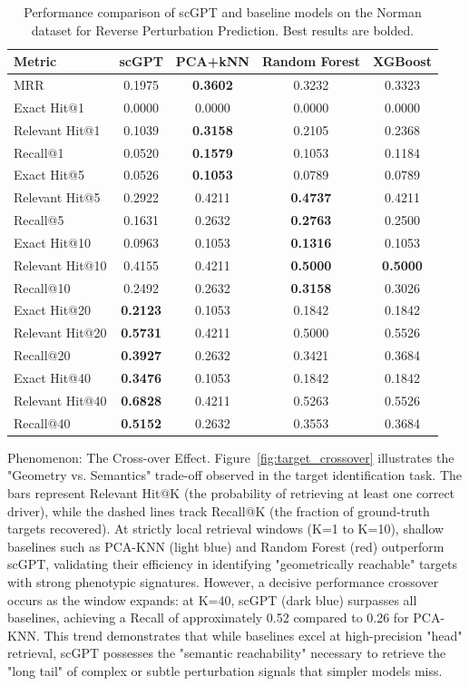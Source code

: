 \documentclass[conference]{IEEEtran}
\begin{document}
\begin{table}[h]
\caption{Performance comparison of scGPT and baseline models on the Norman dataset for Reverse Perturbation Prediction. Best results are bolded.}
\label{tab:reverse_results}
\centering
\begin{tabular}{lcccc}
\hline
Metric & scGPT & PCA+kNN & Random Forest & XGBoost \\
\hline
MRR & 0.1975 & \textbf{0.3602} & 0.3232 & 0.3323 \\
Exact Hit@1 & 0.0000 & 0.0000 & 0.0000 & 0.0000 \\
Relevant Hit@1 & 0.1039 & \textbf{0.3158} & 0.2105 & 0.2368 \\
Recall@1 & 0.0520 & \textbf{0.1579} & 0.1053 & 0.1184 \\
Exact Hit@5 & 0.0526 & \textbf{0.1053} & 0.0789 & 0.0789 \\
Relevant Hit@5 & 0.2922 & 0.4211 & \textbf{0.4737} & 0.4211 \\
Recall@5 & 0.1631 & 0.2632 & \textbf{0.2763} & 0.2500 \\
Exact Hit@10 & 0.0963 & 0.1053 & \textbf{0.1316} & 0.1053 \\
Relevant Hit@10 & 0.4155 & 0.4211 & \textbf{0.5000} & \textbf{0.5000} \\
Recall@10 & 0.2492 & 0.2632 & \textbf{0.3158} & 0.3026 \\
Exact Hit@20 & \textbf{0.2123} & 0.1053 & 0.1842 & 0.1842 \\
Relevant Hit@20 & \textbf{0.5731} & 0.4211 & 0.5000 & 0.5526 \\
Recall@20 & \textbf{0.3927} & 0.2632 & 0.3421 & 0.3684 \\
Exact Hit@40 & \textbf{0.3476} & 0.1053 & 0.1842 & 0.1842 \\
Relevant Hit@40 & \textbf{0.6828} & 0.4211 & 0.5263 & 0.5526 \\
Recall@40 & \textbf{0.5152} & 0.2632 & 0.3553 & 0.3684 \\
\hline
\end{tabular}
\end{table}

Phenomenon: The Cross-over Effect.
Figure~\ref{fig:target_crossover} illustrates the "Geometry vs. Semantics" trade-off observed in the target identification task. The bars represent Relevant Hit@K (the probability of retrieving at least one correct driver), while the dashed lines track Recall@K (the fraction of ground-truth targets recovered). At strictly local retrieval windows (K=1 to K=10), shallow baselines such as PCA-KNN (light blue) and Random Forest (red) outperform scGPT, validating their efficiency in identifying "geometrically reachable" targets with strong phenotypic signatures. However, a decisive performance crossover occurs as the window expands: at K=40, scGPT (dark blue) surpasses all baselines, achieving a Recall of approximately 0.52 compared to 0.26 for PCA-KNN. This trend demonstrates that while baselines excel at high-precision "head" retrieval, scGPT possesses the "semantic reachability" necessary to retrieve the "long tail" of complex or subtle perturbation signals that simpler models miss.
\end{document}
